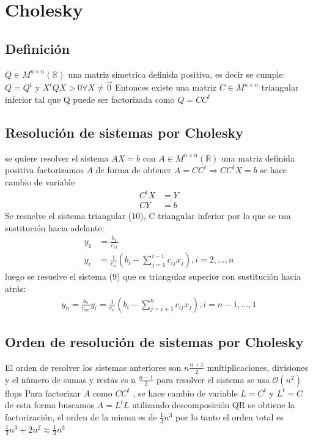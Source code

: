 \documentclass{endm}
\begin{document}
\section{Cholesky}

\subsection{Definición}
$Q \in M ^{n\times n} (\mathbb{R})$ una matriz simetrica definida positiva, es decir se cumple:
 $Q=Q^{t}$  y $X^{t}QX > 0 \forall X \neq \vec{0}$
Entonces existe una matriz $C\in M ^{n\times n}$ triangular inferior tal que Q puede ser factorizada como $Q = CC^{t} $

\subsection{Resolución de sistemas por Cholesky}
se quiere resolver el sistema $AX=b$ con $A \in M ^{n\times n} (\mathbb{R})$ una matriz definida positiva
factorizamos $A$ de forma de obtener $A = CC^{t} \Rightarrow CC^{t}X =b$
se hace cambio de variable
\begin{align}
C^{t}X&= Y\\
CY &= b
\end{align}
Se resuelve el sistema triangular (10), C triangular inferior por lo que se usa sustitución hacia adelante:
\begin{align*}
y_{1}&=\frac{b_{1}}{c_{11}}\\
y_{i}&=\frac{1}{c_{ii}}(b_{i}-\sum _{j=1}^{i-1} c_{ij}x_{j}), i=2,...,n
\end{align*}
luego se resuelve el sistema (9) que es triangular superior con sustitución hacia atrás:
\begin{align*}
y_{n}=\frac{b_{n}}{c_{nn}}
y_{i}=\frac{1}{c_{ii}}(b_{i}-\sum _{j=i+1}^{n} c_{ij}x_{j}), i=n-1,...,1
\end{align*}

\subsection{Orden de resolución de sistemas por Cholesky}
El orden de resolver los sistemas anteriores son $n\frac{n+1}{2}$  multiplicaciones, divisiones y el número de sumas  y restas es n $\frac{n-1}{2}$
para resolver el sistema se usa $\mathcal{O}\left(n^{2}\right)$ flops
Para factorizar $A$ como $CC^{t}$ , se hace cambio de variable $L=C^{t}$ y $L^{t}=C$ de esta forma buscamos $A= L^{t}L$   utilizando descomposición QR se obtiene la factorización, el orden de la misma es de $\frac{1}{3}n^{3}$
por lo tanto el orden total es $\frac{1}{3}n^{3} + 2n^{2} \approx \frac{1}{3}n^{3}$
\end{document}
